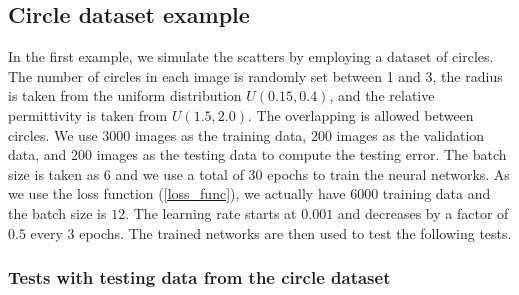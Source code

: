 \documentclass{article}
\begin{document}
	\subsection{Circle dataset example}
	In the first example, we simulate the scatters by employing a dataset of circles. The number of circles in each image is randomly set between 1 and 3, the radius is taken from the uniform distribution $U(0.15,0.4)$, and the relative permittivity is taken from $U(1.5,2.0)$. The overlapping is allowed between circles. We use $3000$ images as the training data, $200$ images as the validation data, and $200$ images as the testing data to compute the testing error. The batch size is taken as $6$ and we use a total of $30$ epochs to train the neural networks. As we use the loss function (\ref*{loss_func}), we actually have $6000$ training data and the batch size is $12$. The learning rate starts at $0.001$ and decreases by a factor of $0.5$ every $3$ epochs. The trained networks are then used to test the following tests.
	
	\subsubsection{Tests with testing data from the circle dataset}
	
\end{document}
